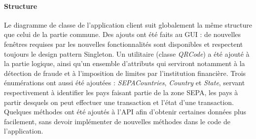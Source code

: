 \paragraph{Structure} Le diagramme de classe de l'application client suit globalement la même structure que celui de la partie commune. Des ajouts ont été faits au GUI : de nouvelles fenêtres requises par les nouvelles fonctionnalités sont disponibles et respectent toujours le design pattern Singleton. Un utilitaire (classe \emph{QRCode}) a été ajouté à la partie logique, ainsi qu'un ensemble d'attributs qui serviront notamment à la détection de fraude et à l'imposition de limites par l'institution financière. Trois énumérations ont aussi été ajoutées : \emph{SEPACountries}, \emph{Country} et \emph{State}, servant respectivement à identifier les pays faisant partie de la zone SEPA, les pays à partir desquels on peut effectuer une transaction et l'état d'une transaction. Quelques méthodes ont été ajoutés à l'API afin d'obtenir certaines données plus facilement, sans devoir implémenter de nouvelles méthodes dans le code de l'application.